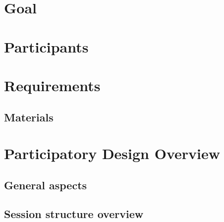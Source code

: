 \section{Goal}
\section{Participants}
\section{Requirements}
\subsection{Materials}
\section{Participatory Design Overview}
\subsection{General aspects}
\subsection{Session structure overview}

